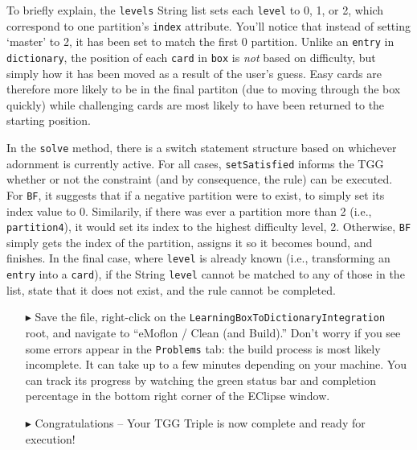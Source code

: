 To briefly explain, the \texttt{levels} String list sets each \texttt{level} to 0, 1, or 2, which correspond to one partition's \texttt{index} attribute. You'll
notice that instead of setting `master' to 2, it has been set to match the first 0 partition. Unlike an \texttt{entry} in \texttt{dictionary}, the position of
each \texttt{card} in \texttt{box} is \emph{not} based on difficulty, but simply how it has been moved as a result of the user's guess. Easy cards are therefore
more likely to be in the final partiton (due to moving through the box quickly) while challenging cards are most likely to have been returned to the starting
position.

In the \texttt{solve} method, there is a switch statement structure based on whichever adornment is currently active. For all cases, \texttt{setSatisfied}
informs the TGG whether or not the constraint (and by consequence, the rule) can be executed. For \texttt{BF}, it suggests that if a negative partition were to
exist, to simply set its index value to 0. Similarily, if there was ever a partition more than 2 (i.e., \texttt{partition4}), it would set its index to the
highest difficulty level, 2. Otherwise, \texttt{BF} simply gets the index of the partition, assigns it so it becomes bound, and finishes. In the final case,
where \texttt{level} is already known (i.e., transforming an \texttt{entry} into a \texttt{card}), if the String \texttt{level} cannot be matched to any of
those in the list, state that it does not exist, and the rule cannot be completed.

\begin{itemize}

\item[$\blacktriangleright$] Save the file, right-click on the \texttt{Learning\-Box\-To\-Dictionary\-Integration} root, and navigate to ``eMoflon / Clean (and
Build).'' Don't worry if you see some errors appear in the \texttt{Problems} tab: the build process is most likely incomplete. It can take up to a few minutes
depending on your machine. You can track its progress by watching the green status bar and completion percentage in the bottom right corner of the EClipse
window.

\item[$\blacktriangleright$] Congratulations -- Your TGG Triple is now complete and ready for execution!

\end{itemize}
